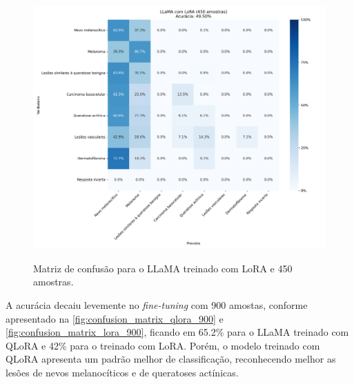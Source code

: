 \begin{figure}[ht]
    \centering
    \caption{\small Matriz de confusão para o \ac{LLaMA} treinado com \ac{LoRA} e 450 amostras.}
    \includegraphics[width=1\columnwidth,keepaspectratio]{images/confusion_matrix_lora_450.png}
    \label{fig:confusion_matrix_lora_450}
\end{figure}

A acurácia decaiu levemente no \textit{fine-tuning} com 900 amostas, conforme apresentado na
\autoref{fig:confusion_matrix_qlora_900} e \autoref{fig:confusion_matrix_lora_900}, ficando em 65.2\% para o \ac{LLaMA}
treinado com \ac{QLoRA} e 42\% para o treinado com \ac{LoRA}. Porém, o modelo treinado com \ac{QLoRA} apresenta um
padrão melhor de classificação, reconhecendo melhor as lesões de nevos melanocíticos e de queratoses actínicas.

\clearpage

